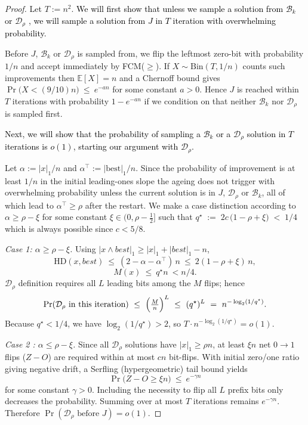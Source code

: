 \begin{proof}
	Let $T:=n^2$. \textcolor{black}{We will first show that unless we sample a solution from $\mathcal{B}_k$ or $\mathcal{D}_\rho$ , we will sample a solution from $J$ in $T$ iteration with overwhelming probability.}
	
	Before $J$, $\mathcal{B}_k$ or $\mathcal{D}_\rho$ is sampled from, we flip the leftmost zero-bit with probability $1/n$ and accept
	immediately by FCM($\ge$).  If $X\sim\mathrm{Bin}(T,1/n)$ counts such improvements then
	$\mathbb{E}[X]=n$ and a Chernoff bound gives
	$
	\Pr\bigl(X<(9/10)n\bigr)\ \le\ e^{-a n}
	$
	for some constant $a>0$. Hence $J$ is reached within $T$ iterations with probability $1-e^{-a n}$ if we condition on that neither $\mathcal{B}_k$ nor $\mathcal{D}_\rho$ is sampled first.
	
	\textcolor{black}{
		Next, we will show that the probability of sampling a $\mathcal{B}_k$ or a $\mathcal{D}_\rho$ solution in $T$ iterations is $o(1)$, starting our argument with $\mathcal{D}_\rho$. 
		}
	
	Let $\alpha:=|x|_1/n$ and $\alpha^\top:=|\text{best}|_1/n$. Since the probability of improvement is at least $1/n$ in the initial leading-ones slope the ageing does not trigger with overwhelming probability unless the current solution is in $J$, $\mathcal{D}_\rho$ or $\mathcal{B}_k$, all of which lead to $\alpha^\top\ge\rho$ after the restart. We make a case distinction according to $\alpha\ge \rho-\xi$ for some constant $\xi\in(0,\rho-\tfrac12]$  such that	$q^\star \;:=\; 2c\,\bigl(1-\rho+\xi\bigr) \;<\; 1/4$ which is always possible since $c<5/8$. 
	
	\emph{Case 1: $\alpha\ge \rho-\xi$.}
	Using $|x\wedge best|_1\ge |x|_1+|best|_1-n$,
	\[
	\mathrm{HD}(x,best)\ \le\ (2-\alpha-\alpha^\top)\,n\ \le\ 2(1-\rho+\xi)\,n,
	\]
	\[
	M(x)\ \le\ q^\star n\ <n/4
	.
	\]
	$\mathcal{D}_\rho$ definition requires all $L$ leading bits among the $M$ flips; hence
	\[
	\Pr(\text{$\mathcal{D}_\rho$ in this iteration})
	\ \le\
	\Bigl(\tfrac{M}{n}\Bigr)^{L}
	\ \le\
	(q^\star)^{L}
	\ =\
	n^{-\log_{2}(1/q^\star)}.
	\]
	Because $q^\star<1/4$, we have $\log_{2}(1/q^\star)>2$, so $T\cdot n^{-\log_{2}(1/q^\star)}=o(1)$.
	
	\emph{Case 2 : $\alpha\le \rho-\xi$.}
	Since all $\mathcal{D}_\rho$ solutions have $|x|_1\ge \rho n$, at least $\xi n$ net $0\!\to\!1$ flips ($Z-O$) are required within at most
	$cn$ bit-flips. With initial zero/one ratio giving negative drift,
	a Serfling (hypergeometric) tail bound yields
	\[
	\Pr\bigl(Z-O\ge \xi n\bigr)\ \le\ e^{-\gamma n}
	\]
	for some constant $\gamma>0$. Including the necessity to flip all $L$ prefix bits only decreases the probability.
	Summing over at most $T$ iterations remains $e^{-\gamma n}$. Therefore $\Pr(\text{$\mathcal{D}_\rho$ before }J)=o(1)$.
	

\end{proof}
